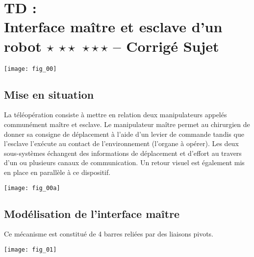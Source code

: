 \chapter*{TD  :\\ 
Interface maître et esclave d'un robot  \ifnormal $\star$ \else \fi \ifdifficile $\star\star$ \else \fi \iftdifficile $\star\star\star$ \else \fi
 -- \ifprof Corrigé \else Sujet \fi}

\iflivret {} \else
\ifprof  {} \else \fi
\fi

\setcounter{question}{0}

\begin{marginfigure}
\texttt{[image: fig\_00]}
\end{marginfigure}


\section*{Mise en situation}
\ifprof
\else
La téléopération consiste à mettre en relation deux manipulateurs appelés communément
maître et esclave. Le manipulateur maître permet au chirurgien de donner sa consigne de
déplacement à l’aide d’un levier de commande tandis que l’esclave l’exécute au contact de
l’environnement (l’organe à opérer). Les deux sous-systèmes échangent des informations de
déplacement et d’effort au travers d’un ou plusieurs canaux de communication. Un retour
visuel est également mis en place en parallèle à ce dispositif.

\begin{marginfigure}
\texttt{[image: fig\_00a]}
\end{marginfigure}
\fi

\section*{Modélisation de l’interface maître}
\ifprof
\else

Ce mécanisme est constitué de 4 barres reliées par des liaisons pivots.

\begin{marginfigure}
\texttt{[image: fig\_01]}
\end{marginfigure}

